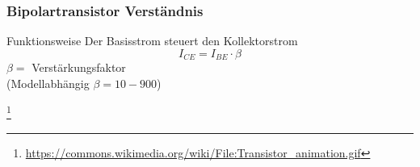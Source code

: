 \begin{frame}
\frametitle{Bipolartransistor Verständnis}
\begin{minipage}{0.55\textwidth}
\begin{center}
    \end{center}
    \end{minipage}
    \begin{minipage}{0.4\textwidth}
    \begin{center}
    \begin{block}{Funktionsweise}
        Der Basisstrom steuert den Kollektorstrom
        $$I_{CE} = I_{BE} \cdot \beta$$
        $\beta = $ Verstärkungsfaktor \\ (Modellabhängig $\beta = 10-900$)
    \end{block}
    \end{center}
    \end{minipage}
	\footnote{\url{https://commons.wikimedia.org/wiki/File:Transistor_animation.gif}}\\
\end{frame}


